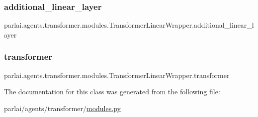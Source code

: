 \subsubsection{\texorpdfstring{additional\+\_\+linear\+\_\+layer}{additional\_linear\_layer}}
{\footnotesize\ttfamily parlai.\+agents.\+transformer.\+modules.\+Transformer\+Linear\+Wrapper.\+additional\+\_\+linear\+\_\+layer}

\mbox{\label{classparlai_1_1agents_1_1transformer_1_1modules_1_1TransformerLinearWrapper_acac2d2f099f07b21f792326f90541ffd}} 
\subsubsection{\texorpdfstring{transformer}{transformer}}
{\footnotesize\ttfamily parlai.\+agents.\+transformer.\+modules.\+Transformer\+Linear\+Wrapper.\+transformer}



The documentation for this class was generated from the following file\+:\begin{DoxyCompactItemize}
\item 
parlai/agents/transformer/\hyperlink{parlai_2agents_2transformer_2modules_8py}{modules.\+py}\end{DoxyCompactItemize}

